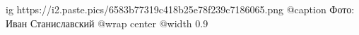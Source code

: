  
 
 
 
 

\ifcmt
  ig https://i2.paste.pics/6583b77319c418b25e78f239c7186065.png
	@caption Фото: Иван Станиславский
  @wrap center
  @width 0.9
\fi
